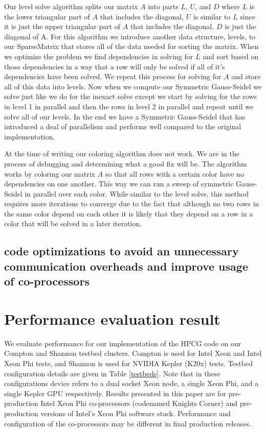 \documentclass{ccr15}
\begin{document}
Our level solve algorithm splits our matrix $A$ into parts $L$, $U$, and $D$ where $L$ is the
lower triangular part of $A$ that includes the diagonal, $U$ is similar to $L$ since it is just
the upper triangular part of $A$ that includes the diagonal. $D$ is just the diagonal of A. For
this algorithm we introduce another data structure, levels, to our SparseMatrix that stores all 
of the data needed for sorting the matrix. When we optimize the problem we find dependencies in
solving for $L$ and sort based on those dependencies in a way that a row will only be solved if
all of it's dependencies have been solved. We repeat this process for solving for $A$ and store
all of this data into levels. Now when we compute our Symmetric Gauss-Seidel we solve just like
we do for the inexact solve except we start by solving for the rows in level 1 in parallel and
then the rows in level 2 in parallel and repeat until we solve all of our levels. In the end we
have a Symmetric Gauss-Seidel that has introduced a deal of parallelism and performs well
compared to the original implementation.

At the time of writing our coloring algorithm does not work. We are in the process of debugging and
determining what a good fix will be. The algorithm works by coloring our matrix $A$ so that all rows
with a certain color have no dependencies on one another. This way we can run a sweep of symmetric
Gauss-Seidel in parallel over each color. While similar to the level solve, this method requires more iterations
to converge due to the fact that although no two rows in the same color depend on each other it is likely
that they depend on a row in a color that will be solved in a later iteration.

\subsection{code optimizations to avoid an unnecessary communication overheads and improve usage of co-processors}

\section{Performance evaluation result}
We evaluate performance for our implementation of the HPCG code on our Compton and Shannon testbed clusters. Compton is used for Intel Xeon and Intel Xeon Phi tests, and Shannon is used for NVIDIA Kepler (K20x) tests. Testbed configuration details are given in Table \ref{testbeds}. Note that in these configurations device refers to a dual socket Xeon node, a single Xeon Phi, and a single Kepler GPU respectively.
Results presented in this paper are for pre-production Intel Xeon Phi co-processors (codenamed Knights Corner) and pre-production versions of Intel{'}s Xeon Phi software stack. Performance and configuration of the co-processors may be different in final production releases.
\end{document}

